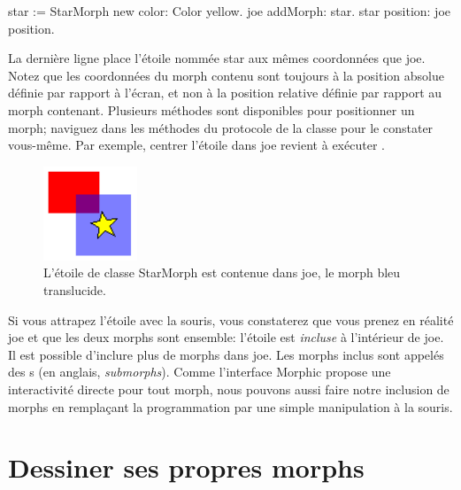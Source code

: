 \documentclass[a4paper,10pt,twoside]{book}
\begin{document}
\begin{code}{}
star := StarMorph new color: Color yellow.
joe addMorph: star.
star position: joe position.
\end{code}

\noindent
La dernière ligne place l'étoile nommée star aux mêmes
coordonnées que joe. Notez que les coordonnées du morph
contenu sont toujours à la position absolue définie par rapport
à l'écran, et non à la position relative définie par rapport
au morph contenant.
Plusieurs méthodes sont disponibles pour positionner un morph;
naviguez dans les méthodes du protocole  de la
classe  pour le constater vous-même.
Par exemple, centrer l'étoile dans joe revient à exécuter
  .

\begin{figure}[ht]
	\centerline{\includegraphics{joeStar}}
	\caption{L'étoile de classe StarMorph est contenue dans joe, le
      morph bleu translucide.}
\end{figure}

Si vous attrapez l'étoile avec la souris, vous constaterez que vous
prenez en réalité joe et que les deux morphs sont ensemble:
l'étoile est \emph{incluse} %
à l'intérieur de joe.
Il est possible d'inclure plus de morphs dans joe. %
Les morphs inclus sont appelés des s (en anglais,
\emph{submorphs}). %
Comme l'interface Morphic propose une interactivité directe pour
tout morph, nous pouvons aussi faire notre inclusion de morphs en
remplaçant la programmation par une simple manipulation à la souris.

\section{Dessiner ses propres morphs}
\end{document}
